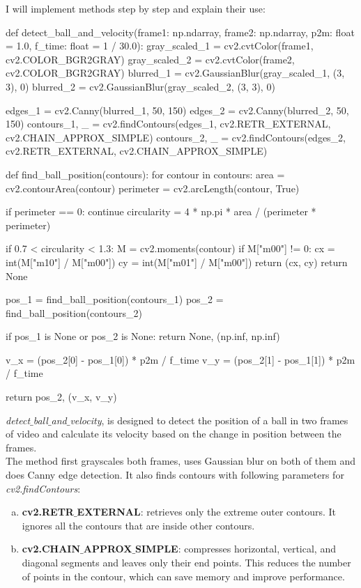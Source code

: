 \documentclass{article}
\begin{document}
	I will implement methods step by step and explain their use:
\begin{python}
def detect_ball_and_velocity(frame1: np.ndarray, frame2: np.ndarray, p2m: float = 1.0, f_time: float = 1 / 30.0):
	gray_scaled_1 = cv2.cvtColor(frame1, cv2.COLOR_BGR2GRAY)
	gray_scaled_2 = cv2.cvtColor(frame2, cv2.COLOR_BGR2GRAY)
	blurred_1 = cv2.GaussianBlur(gray_scaled_1, (3, 3), 0)
	blurred_2 = cv2.GaussianBlur(gray_scaled_2, (3, 3), 0)
	
	edges_1 = cv2.Canny(blurred_1, 50, 150)
	edges_2 = cv2.Canny(blurred_2, 50, 150)
	contours_1, _ = cv2.findContours(edges_1, cv2.RETR_EXTERNAL, cv2.CHAIN_APPROX_SIMPLE)
	contours_2, _ = cv2.findContours(edges_2, cv2.RETR_EXTERNAL, cv2.CHAIN_APPROX_SIMPLE)
	
	def find_ball_position(contours):
		for contour in contours:
			area = cv2.contourArea(contour)
			perimeter = cv2.arcLength(contour, True)
			
			if perimeter == 0:
				continue
			circularity = 4 * np.pi * area / (perimeter * perimeter)
			
			if 0.7 < circularity < 1.3:
				M = cv2.moments(contour)
				if M["m00"] != 0:
					cx = int(M["m10"] / M["m00"])
					cy = int(M["m01"] / M["m00"])
					return (cx, cy)
		return None
	
	pos_1 = find_ball_position(contours_1)
	pos_2 = find_ball_position(contours_2)
	
	if pos_1 is None or pos_2 is None:
		return None, (np.inf, np.inf)
	
	v_x = (pos_2[0] - pos_1[0]) * p2m / f_time
	v_y = (pos_2[1] - pos_1[1]) * p2m / f_time
	
	return pos_2, (v_x, v_y)
\end{python}
	
	\textit{detect$\_$ball$\_$and$\_$velocity}, is designed to detect the position of a ball in two frames of video and calculate its velocity based on the change in position between the frames. \\
	
	The method first grayscales both frames, uses Gaussian blur on both of them and does Canny edge detection. It also finds contours with following parameters for \textit{cv2.findContours}: \\
	\begin{enumerate}[a.]
		\item \textbf{cv2.RETR$\_$EXTERNAL}: retrieves only the extreme outer contours. It ignores all the contours that are inside other contours.
		\item \textbf{cv2.CHAIN$\_$APPROX$\_$SIMPLE}: compresses horizontal, vertical, and diagonal segments and leaves only their end points. This reduces the number of points in the contour, which can save memory and improve performance. \\
	\end{enumerate}
	
\end{document}
